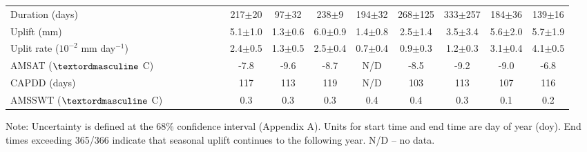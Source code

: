 \begin{table}
\begin{adjustbox}{width=1\textwidth}
\begin{threeparttable}
\begin{tabular}{lcccccccccccccc}
Duration (days)&&&&&&&217$\pm$20&97$\pm$32&238$\pm$9&194$\pm$32&268$\pm$125&333$\pm$257&184$\pm$36&139$\pm$16\\
Uplift (mm)&&&&&&&5.1$\pm$1.0&1.3$\pm$0.6&6.0$\pm$0.9&1.4$\pm$0.8&2.5$\pm$1.4&3.5$\pm$3.4&5.6$\pm$2.0&5.7$\pm$1.9\\
Uplit rate ($10^{-2}$ mm day$^{-1}$)&&&&&&&2.4$\pm$0.5&1.3$\pm$0.5&2.5$\pm$0.4&0.7$\pm$0.4&0.9$\pm$0.3&1.2$\pm$0.3&3.1$\pm$0.4&4.1$\pm$0.5\\
AMSAT ($\textordmasculine$ C)&&&&&&&-7.8&-9.6&-8.7&N/D&-8.5&-9.2&-9.0&-6.8\\
CAPDD (days)&&&&&&&117&113&119&N/D&103&113&107&116\\
AMSSWT  ($\textordmasculine$ C)&&&&&&&0.3&0.3&0.3&0.4&0.4&0.3&0.1&0.2\\
\midrule
\end{tabular}
\begin{tablenotes}
\small
\item Note: Uncertainty is defined at the 68\% confidence interval (Appendix A).  Units for start time and end time are day of year (doy). End times exceeding 365/366 indicate that seasonal uplift continues to the following year. N/D – no data.  
\end{tablenotes}
\end{threeparttable}
\end{adjustbox}
\label{tab:chpt3_table1}
\end{table}

